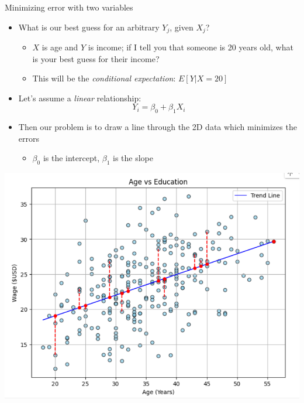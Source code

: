 \documentclass[aspectratio=169]{beamer}
\begin{document}
\begin{frame}{Minimizing error with two variables}
    \begin{itemize}
        \item What is our best guess for an arbitrary $Y_j$, given $X_j$?
        \begin{itemize}
            \item $X$ is age and $Y$ is income; if I tell you that someone is 20 years old, what is your best guess for their income?
            \item This will be the \textit{conditional expectation}: $E[Y|X=20]$
        \end{itemize}        
        \item Let's assume a \textit{linear} relationship:
        $$
        Y_i = \beta_0 + \beta_1 X_i
        $$
        \item Then our problem is to draw a line through the 2D data which minimizes the errors
        \begin{itemize}
            \item $\beta_0$ is the intercept, $\beta_1$ is the slope
        \end{itemize}
    \end{itemize}
\end{frame}

\begin{frame}
    \centering
    \includegraphics[width = .6\textwidth,keepaspectratio]{./figs/age_ed.png}
\end{frame}
\end{document}
